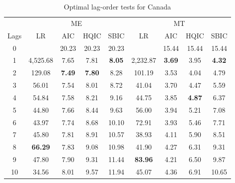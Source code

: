 \documentclass[a4paper, twoside]{templates/ociamthesis}
\begin{document}
\begin{table}[H]

\caption{\label{tab:TableC23}Optimal lag-order tests for Canada}
\centering
\fontsize{10}{12}\selectfont
\begin{tabular}[t]{ccccccccc}
\toprule
\multicolumn{1}{c}{ } & \multicolumn{4}{c}{ME} & \multicolumn{4}{c}{MT} \\
\cmidrule(l{3pt}r{3pt}){2-5} \cmidrule(l{3pt}r{3pt}){6-9}
Lags & LR & AIC & HQIC & SBIC & LR & AIC & HQIC & SBIC\\
\midrule
0 &  & 20.23 & 20.23 & 20.23 &  & 15.44 & 15.44 & 15.44\\
1 & 4,525.68 & 7.65 & 7.81 & \textbf{8.05} & 2,232.87 & \textbf{3.69} & 3.95 & \textbf{4.32}\\
2 & 129.08 & \textbf{7.49} & \textbf{7.80} & 8.28 & 101.19 & 3.53 & 4.04 & 4.79\\
3 & 56.01 & 7.54 & 8.01 & 8.72 & 41.04 & 3.70 & 4.47 & 5.59\\
4 & 54.84 & 7.58 & 8.21 & 9.16 & 44.75 & 3.85 & \textbf{4.87} & 6.37\\
5 & 44.80 & 7.66 & 8.44 & 9.63 & 56.00 & 3.94 & 5.21 & 7.08\\
6 & 43.97 & 7.74 & 8.68 & 10.10 & 72.91 & 3.93 & 5.46 & 7.71\\
7 & 45.80 & 7.81 & 8.91 & 10.57 & 38.93 & 4.11 & 5.90 & 8.51\\
8 & \textbf{66.29} & 7.83 & 9.08 & 10.98 & 41.90 & 4.27 & 6.31 & 9.31\\
9 & 47.80 & 7.90 & 9.31 & 11.44 & \textbf{83.96} & 4.21 & 6.50 & 9.87\\
10 & 34.56 & 8.01 & 9.57 & 11.94 & 45.07 & 4.36 & 6.91 & 10.65\\
\bottomrule
\end{tabular}
\end{table}
\end{document}

